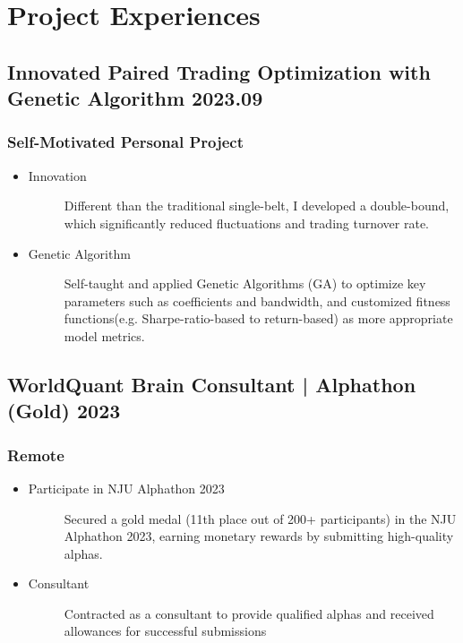 \documentclass[a4paper]{article}
\begin{document}
\hypertarget{project-exp}{
    \section{Project Experiences}
}

\subsection{Innovated Paired Trading Optimization with Genetic Algorithm \normalfont \hfill 2023.09}
\subsubsection{Self-Motivated Personal Project}
\begin{itemize}
    \item\begin{description}
        \item[Innovation] Different than the traditional single-belt, I developed a double-bound, which significantly reduced fluctuations and trading turnover rate. 
    \end{description}
    \item\begin{description}
        \item[Genetic Algorithm] Self-taught and applied Genetic Algorithms (GA) to optimize key parameters such as coefficients and bandwidth, and customized fitness functions(e.g. Sharpe-ratio-based to return-based) as more appropriate model metrics. 
    \end{description}
\end{itemize}

\subsection{WorldQuant Brain Consultant | Alphathon (Gold) \normalfont  \hfill 2023}
\subsubsection{Remote}
\begin{itemize}
    \item\begin{description}
        \item[Participate in NJU Alphathon 2023] Secured a gold medal (11th place out of 200+ participants) in the NJU Alphathon 2023, earning monetary rewards by submitting high-quality alphas.
    \end{description}
    \item\begin{description}
        \item[Consultant] Contracted as a consultant to provide qualified alphas and received allowances for successful submissions 
    \end{description}
\end{itemize}  
\end{document}
